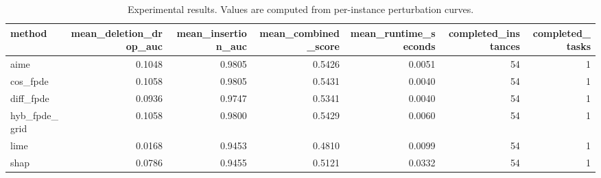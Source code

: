\begin{table}[t]
\caption{Experimental results. Values are computed from per-instance perturbation curves.}
\label{tab:main_results_computed}
\centering
\begin{tabular}{lrrrrrr}
\toprule
method & mean\_deletion\_drop\_auc & mean\_insertion\_auc & mean\_combined\_score & mean\_runtime\_seconds & completed\_instances & completed\_tasks \\
\midrule
aime & 0.1048 & 0.9805 & 0.5426 & 0.0051 & 54 & 1 \\
cos\_fpde & 0.1058 & 0.9805 & 0.5431 & 0.0040 & 54 & 1 \\
diff\_fpde & 0.0936 & 0.9747 & 0.5341 & 0.0040 & 54 & 1 \\
hyb\_fpde\_grid & 0.1058 & 0.9800 & 0.5429 & 0.0060 & 54 & 1 \\
lime & 0.0168 & 0.9453 & 0.4810 & 0.0099 & 54 & 1 \\
shap & 0.0786 & 0.9455 & 0.5121 & 0.0332 & 54 & 1 \\
\bottomrule
\end{tabular}

\end{table}
